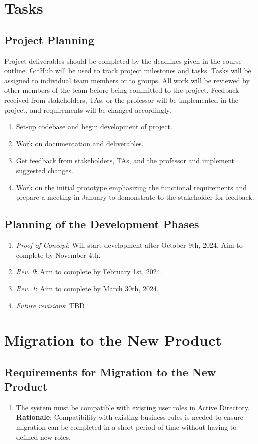 \documentclass[12pt]{article}
\begin{document}
\section{Tasks}
\subsection{Project Planning}
Project deliverables should be completed by the deadlines given in
the course outline. GitHub will be used to track project milestones
and tasks. Tasks will be assigned to individual team members or to
groups. All work will be reviewed by other members of the team before
being committed to the project. Feedback received from stakeholders,
TAs, or the professor will be implemented in the project, and
requirements will be changed accordingly.
\begin{enumerate} [{Task }1.]
  \item Set-up codebase and begin development of project.
  \item Work on documentation and deliverables.
  \item Get feedback from stakeholders, TAs, and the professor and implement
    suggested changes.
  \item Work on the initial prototype emphasizing the functional requirements and prepare a meeting in January
to demonstrate to the stakeholder for feedback.
\end{enumerate}

\subsection{Planning of the Development Phases}
\begin{enumerate}
  \item \textit{Proof of Concept}: Will start development after
    October 9th, 2024. Aim to complete by November 4th.
  \item \textit{Rev. 0}: Aim to complete by February 1st, 2024.
  \item \textit{Rev. 1}: Aim to complete by March 30th, 2024.
  \item \textit{Future revisions}: TBD
\end{enumerate}

\section{Migration to the New Product}
\subsection{Requirements for Migration to the New Product}
\begin{enumerate} [{MI-NP}1.]
  \item The system must be compatible with existing user roles in Active
    Directory.\\
    \textbf{Rationale}: Compatibility with existing business rules is needed
    to ensure migration can be completed in a short period of time without
    having to defined new roles.
\end{enumerate}
\end{document}

